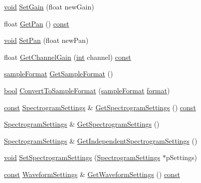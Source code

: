 \begin{DoxyCompactItemize}
\hyperlink{sound_8c_ae35f5844602719cf66324f4de2a658b3}{void} \hyperlink{class_wave_track_aa64cfe45ca3be7f2067f263784d2a864}{Set\+Gain} (float new\+Gain)
\item 
float \hyperlink{class_wave_track_a39fb6133b9ead187e3eb8127fd8966c0}{Get\+Pan} () \hyperlink{getopt1_8c_a2c212835823e3c54a8ab6d95c652660e}{const} 
\item 
\hyperlink{sound_8c_ae35f5844602719cf66324f4de2a658b3}{void} \hyperlink{class_wave_track_a8711fa41c9fcec3519d80286a96f049d}{Set\+Pan} (float new\+Pan)
\item 
float \hyperlink{class_wave_track_a93d35f717c7120f01d93ccb0e1d18db4}{Get\+Channel\+Gain} (\hyperlink{xmltok_8h_a5a0d4a5641ce434f1d23533f2b2e6653}{int} channel) \hyperlink{getopt1_8c_a2c212835823e3c54a8ab6d95c652660e}{const} 
\item 
\hyperlink{include_2audacity_2_types_8h_a9938d2e2f6adef23e745cd80ef379792}{sample\+Format} \hyperlink{class_wave_track_aeacd5bae293c72523bcde439345739f7}{Get\+Sample\+Format} ()
\item 
\hyperlink{mac_2config_2i386_2lib-src_2libsoxr_2soxr-config_8h_abb452686968e48b67397da5f97445f5b}{bool} \hyperlink{class_wave_track_ae54ac2b95b5b6adfcbbba34964f7fee3}{Convert\+To\+Sample\+Format} (\hyperlink{include_2audacity_2_types_8h_a9938d2e2f6adef23e745cd80ef379792}{sample\+Format} \hyperlink{_export_p_c_m_8cpp_a317afff57d87a89158c2b038d37b2b08}{format})
\item 
\hyperlink{getopt1_8c_a2c212835823e3c54a8ab6d95c652660e}{const} \hyperlink{class_spectrogram_settings}{Spectrogram\+Settings} \& \hyperlink{class_wave_track_a54f8ed0c9c1d1fae0241867565b33512}{Get\+Spectrogram\+Settings} () \hyperlink{getopt1_8c_a2c212835823e3c54a8ab6d95c652660e}{const} 
\item 
\hyperlink{class_spectrogram_settings}{Spectrogram\+Settings} \& \hyperlink{class_wave_track_a1a73f266c9172e34b51d6c1b78d2ec8c}{Get\+Spectrogram\+Settings} ()
\item 
\hyperlink{class_spectrogram_settings}{Spectrogram\+Settings} \& \hyperlink{class_wave_track_af7353bc939d97b3090ef20a0e0a6707b}{Get\+Independent\+Spectrogram\+Settings} ()
\item 
\hyperlink{sound_8c_ae35f5844602719cf66324f4de2a658b3}{void} \hyperlink{class_wave_track_a994147b87a99e06d53fdb80acca46e32}{Set\+Spectrogram\+Settings} (\hyperlink{class_spectrogram_settings}{Spectrogram\+Settings} $\ast$p\+Settings)
\item 
\hyperlink{getopt1_8c_a2c212835823e3c54a8ab6d95c652660e}{const} \hyperlink{class_waveform_settings}{Waveform\+Settings} \& \hyperlink{class_wave_track_a10c50123dc26cba66469b011c1852047}{Get\+Waveform\+Settings} () \hyperlink{getopt1_8c_a2c212835823e3c54a8ab6d95c652660e}{const} 

\end{DoxyCompactItemize}
